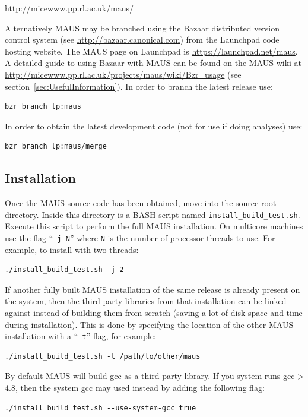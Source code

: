 \documentclass[a4paper,10pt]{article}
\begin{document}
    \medskip
    \url{http://micewww.pp.rl.ac.uk/maus/} 
    \medskip

    Alternatively MAUS may be branched using the Bazaar distributed version control system (see \url{http://bazaar.canonical.com}) from the Launchpad code hosting website. The MAUS page on Launchpad is \url{https://launchpad.net/maus}. A detailed guide to using Bazaar with MAUS can be found on the MAUS wiki at \url{http://micewww.pp.rl.ac.uk/projects/maus/wiki/Bzr_usage} (see section~\ref{sec:UsefulInformation}). In order to branch the latest release use:
    \begin{lstlisting}
bzr branch lp:maus
    \end{lstlisting}
    In order to obtain the latest development code (not for use if doing analyses) use:
    \begin{lstlisting}
bzr branch lp:maus/merge
    \end{lstlisting}

  \subsection{Installation}
    Once the MAUS source code has been obtained, move into the source root directory. Inside this directory is a BASH script named \texttt{install\_build\_test.sh}. Execute this script to perform the full MAUS installation. On multicore machines use the flag ``\texttt{-j N}'' where \texttt{N} is the number of processor threads to use. For example, to install with two threads:
    \begin{lstlisting}
./install_build_test.sh -j 2
    \end{lstlisting}
    If another fully built MAUS installation of the same release is already present on the system, then the third party libraries from that installation can be linked against instead of building them from scratch (saving a lot of disk space and time during installation).  This is done by specifying the location of the other MAUS installation with a ``\texttt{-t}'' flag, for example:
    \begin{lstlisting}
./install_build_test.sh -t /path/to/other/maus
    \end{lstlisting}
    By default MAUS will build gcc as a third party library. If you system runs gcc > 4.8, then the system gcc may used instead by adding the following flag:
    \begin{lstlisting}
./install_build_test.sh --use-system-gcc true
    \end{lstlisting}  
    
\end{document}
